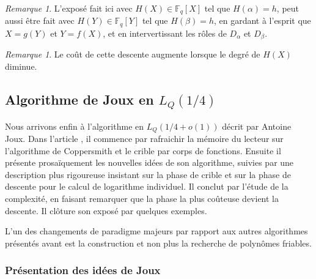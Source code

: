 \documentclass[a4paper, titlepage, 11pt]{article}
\theoremstyle{definition}
\theoremstyle{remark}
\newtheorem{rema}[theo]{Remarque}
\def\o{o}
\def\gf #1{\mathbb{F}_{#1}}
\begin{document}
\begin{rema}
L'exposé fait ici avec $H(X)\in\gf{q}[X]$ tel que $H(\alpha) = h$, peut aussi être fait avec $H(Y)\in\gf{q}[Y]$ tel que $H(\beta) = h$, en gardant à l'esprit que $X = g(Y)$ et $Y = f(X)$, et en intervertissant les rôles de $D_\alpha$ et $D_\beta$.
\end{rema}
\begin{rema}
Le coût de cette descente augmente lorsque le degré de $H(X)$ diminue.
\end{rema}

\subsection{Algorithme de Joux en $L_{Q}(1/4)$}\label{s-sec:algoJoux}

Nous arrivons enfin à l'algorithme en $L_{Q}(1/4 + \o(1))$ décrit par Antoine Joux. Dans l'article \cite{joux2013}, il commence par rafraichir la mémoire du lecteur sur l'algorithme de Coppersmith et le crible par corps de fonctions. Ensuite il présente prosaïquement les nouvelles idées de son algorithme, suivies par une description plus rigoureuse insistant sur la phase de crible et sur la phase de descente pour le calcul de logarithme individuel. Il conclut par l'étude de la complexité, en faisant remarquer que la phase la plus coûteuse devient la descente. Il clôture son exposé par quelques exemples.

L'un des changements de paradigme majeurs par rapport aux autres algorithmes présentés avant est la construction et non plus la recherche de polynômes friables.

\subsubsection{Présentation des idées de Joux}\label{ss-sec:idees}
\end{document}
